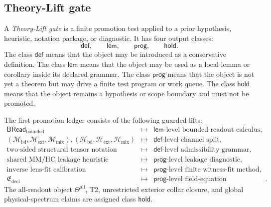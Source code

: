 \subsection{Theory-Lift gate}
\label{subsec:v470-r01-theory-lift-gate}

\begin{definition}
\label{def:v470-r01-theory-lift-gate}
A \emph{Theory-Lift gate} is a finite promotion test applied to a prior
hypothesis, heuristic, notation package, or diagnostic.  It has four output
classes:
\[
\mathsf{def},\qquad \mathsf{lem},\qquad \mathsf{prog},\qquad \mathsf{hold}.
\]
The class \(\mathsf{def}\) means that the object may be introduced as a
conservative definition.  The class \(\mathsf{lem}\) means that the object may
be used as a local lemma or corollary inside its declared grammar.  The class
\(\mathsf{prog}\) means that the object is not yet a theorem but may drive a
finite test program or work queue.  The class \(\mathsf{hold}\) means that the
object remains a hypothesis or scope boundary and must not be promoted.
\end{definition}

\begin{definition}
\label{def:v470-r01-promotion-ledger}
The first promotion ledger consists of the following guarded lifts:
\[
\begin{array}{lll}
\mathsf{BRead}_{\mathrm{bounded}} &\mapsto& \mathsf{lem}\text{-level bounded-readout calculus},\\
(\mathcal M_{\mathrm{bd}},\mathcal M_{\mathrm{ext}},\mathcal M_{\mathrm{mix}}),
(\mathcal H_{\mathrm{bd}},\mathcal H_{\mathrm{ext}},\mathcal H_{\mathrm{mix}})
&\mapsto& \mathsf{def}\text{-level channel split},\\
\text{two-sided structural tensor notation} &\mapsto& \mathsf{def}\text{-level admissibility grammar},\\
\text{shared MM/HC leakage heuristic} &\mapsto& \mathsf{prog}\text{-level leakage diagnostic},\\
\text{inverse lens-fit calibration} &\mapsto& \mathsf{prog}\text{-level finite witness-fit method},\\
\mathfrak E_{\mathrm{decl}} &\mapsto& \mathsf{prog}\text{-level field-equation admissibility template}.
\end{array}
\]
The all-readout object \(\Theta^{\mathrm{all}}\), T2, unrestricted exterior
collar closure, and global physical-spectrum claims are assigned class
\(\mathsf{hold}\).
\end{definition}

